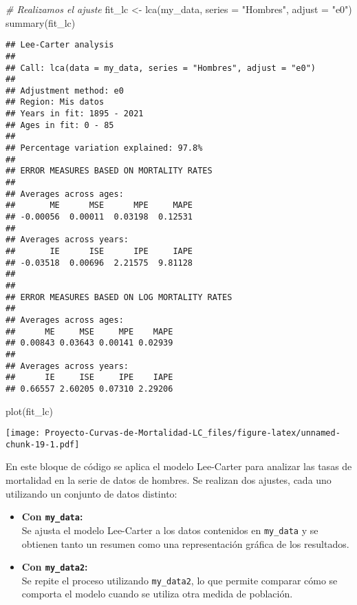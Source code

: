 \documentclass[
]{article}
\newenvironment{Shaded}{\begin{snugshade}}{\end{snugshade}}
\newcommand{\AttributeTok}[1]{\textcolor[rgb]{0.77,0.63,0.00}{#1}}
\newcommand{\CommentTok}[1]{\textcolor[rgb]{0.56,0.35,0.01}{\textit{#1}}}
\newcommand{\FunctionTok}[1]{\textcolor[rgb]{0.00,0.00,0.00}{#1}}
\newcommand{\NormalTok}[1]{#1}
\newcommand{\OtherTok}[1]{\textcolor[rgb]{0.56,0.35,0.01}{#1}}
\newcommand{\StringTok}[1]{\textcolor[rgb]{0.31,0.60,0.02}{#1}}
\begin{document}
\begin{Shaded}
\begin{Highlighting}[]
\CommentTok{\# Realizamos el ajuste}
\NormalTok{fit\_lc }\OtherTok{\textless{}{-}} \FunctionTok{lca}\NormalTok{(my\_data, }\AttributeTok{series =} \StringTok{"Hombres"}\NormalTok{, }\AttributeTok{adjust =} \StringTok{"e0"}\NormalTok{)}
\FunctionTok{summary}\NormalTok{(fit\_lc)}
\end{Highlighting}
\end{Shaded}

\begin{verbatim}
## Lee-Carter analysis
## 
## Call: lca(data = my_data, series = "Hombres", adjust = "e0") 
## 
## Adjustment method: e0
## Region: Mis datos
## Years in fit: 1895 - 2021
## Ages in fit: 0 - 85 
## 
## Percentage variation explained: 97.8%
## 
## ERROR MEASURES BASED ON MORTALITY RATES
## 
## Averages across ages:
##       ME      MSE      MPE     MAPE 
## -0.00056  0.00011  0.03198  0.12531 
## 
## Averages across years:
##       IE      ISE      IPE     IAPE 
## -0.03518  0.00696  2.21575  9.81128 
## 
## 
## ERROR MEASURES BASED ON LOG MORTALITY RATES
## 
## Averages across ages:
##      ME     MSE     MPE    MAPE 
## 0.00843 0.03643 0.00141 0.02939 
## 
## Averages across years:
##      IE     ISE     IPE    IAPE 
## 0.66557 2.60205 0.07310 2.29206
\end{verbatim}

\begin{Shaded}
\begin{Highlighting}[]
\FunctionTok{plot}\NormalTok{(fit\_lc)}
\end{Highlighting}
\end{Shaded}

\texttt{[image: Proyecto-Curvas-de-Mortalidad-LC\_files/figure-latex/unnamed-chunk-19-1.pdf]}

En este bloque de código se aplica el modelo Lee-Carter para analizar
las tasas de mortalidad en la serie de datos de hombres. Se realizan dos
ajustes, cada uno utilizando un conjunto de datos distinto:

\begin{itemize}
\item
  \textbf{Con \texttt{my\_data}:}\\
  Se ajusta el modelo Lee-Carter a los datos contenidos en
  \texttt{my\_data} y se obtienen tanto un resumen como una
  representación gráfica de los resultados.
\item
  \textbf{Con \texttt{my\_data2}:}\\
  Se repite el proceso utilizando \texttt{my\_data2}, lo que permite
  comparar cómo se comporta el modelo cuando se utiliza otra medida de
  población.
\end{itemize}
\end{document}
